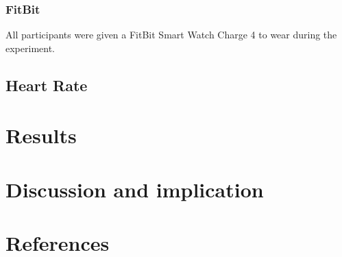 \documentclass[
  man]{apa6}
\begin{document}
\hypertarget{fitbit}{%
\subsubsection{FitBit}\label{fitbit}}

All participants were given a FitBit Smart Watch Charge 4 to wear during the experiment.

\hypertarget{heart-rate}{%
\subsection{Heart Rate}\label{heart-rate}}

\hypertarget{results}{%
\section{Results}\label{results}}

\hypertarget{discussion-and-implication}{%
\section{Discussion and implication}\label{discussion-and-implication}}

\newpage

\hypertarget{references}{%
\section{References}\label{references}}
\end{document}
